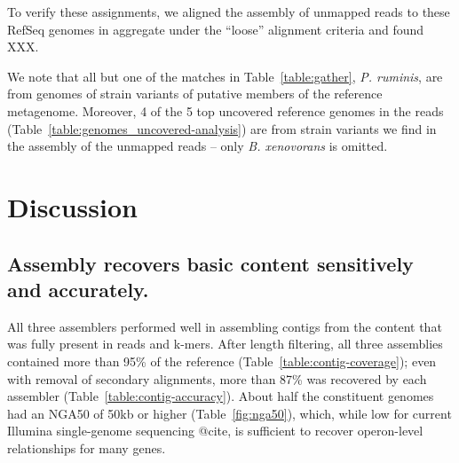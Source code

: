 \documentclass[10pt,a4paper,twocolumn]{article}
\begin{document}

To verify these assignments, we aligned the assembly of unmapped reads
to these RefSeq genomes in aggregate under the ``loose'' alignment
criteria and found XXX.

We note that all but one of the matches in Table~\ref{table:gather},
{\em P. ruminis}, are from genomes of strain variants of putative
members of the reference metagenome.  Moreover, 4 of the 5 top
uncovered reference genomes in the reads
(Table~\ref{table:genomes_uncovered-analysis}) are from strain
variants we find in the assembly of the unmapped reads -- only {\em
  B. xenovorans} is omitted.


\section*{Discussion}

\subsection*{Assembly recovers basic content sensitively and accurately.}

All three assemblers performed well in assembling contigs from the
content that was fully present in reads and k-mers.  After length filtering,
all three assemblies contained more than 95\% of the reference
(Table~\ref{table:contig-coverage}); even with removal of secondary
alignments, more than 87\% was recovered by each assembler
(Table~\ref{table:contig-accuracy}). About half the constituent genomes had
an NGA50 of 50kb or higher (Table~\ref{fig:nga50}),
which, while low for current Illumina single-genome sequencing @cite,
is sufficient to recover operon-level relationships for many genes.
\end{document}
